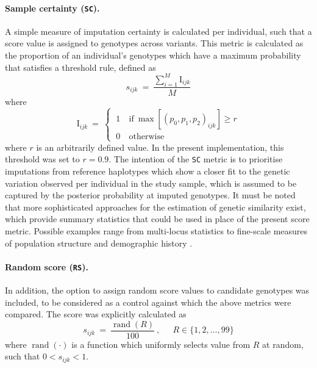 \paragraph{Sample certainty (\texttt{SC}).}
A simple measure of imputation certainty is calculated per individual, such that a score value is assigned to genotypes across variants.
This metric is calculated as the proportion of an individual's genotypes which have a maximum probability that satisfies a threshold rule, defined as
\begin{equation}
	s_{ijk} ~=~ \frac{\sum_{i=1}^{M} \text{I}_{ijk}}{M}
\end{equation}
where
\begin{equation}
	\text{I}_{ijk} ~=~
	\begin{cases}
    ~ 1 & ~ \text{if} ~ \max\left[(p_0,p_1,p_2)_{ijk}\right] \geq r\\
    ~ 0 & ~ \text{otherwise}
  \end{cases}
\end{equation}
where $r$ is an arbitrarily defined value.
In the present implementation, this threshold was set to ${r=0.9}$.
The intention of the \texttt{SC} metric is to prioritise imputations from reference haplotypes which show a closer fit to the genetic variation observed per individual in the study sample, which is assumed to be captured by the posterior probability at imputed genotypes.
It must be noted that more sophisticated approaches for the estimation of genetic similarity exist, which provide summary statistics that could be used in place of the present score metric.
Possible examples range from multi-locus statistics to fine-scale measures of population structure and demographic history \citep[\eg][]{McVean:2004ca, Lawson:2012ha}.

\paragraph{Random score (\texttt{RS}).}
In addition, the option to assign random score values to candidate genotypes was included, to be considered as a control against which the above metrics were compared.
The score was explicitly calculated as
\begin{equation}
	s_{ijk} ~=~ \frac{\operatorname{rand}(R)}{100}\ , ~\quad~ R \in \{ 1,2,\ldots, 99 \}
\end{equation}
where $\operatorname{rand}{(\cdot)}$ is a function which uniformly selects  value from $R$ at random, such that ${0 < s_{ijk} < 1}$.


